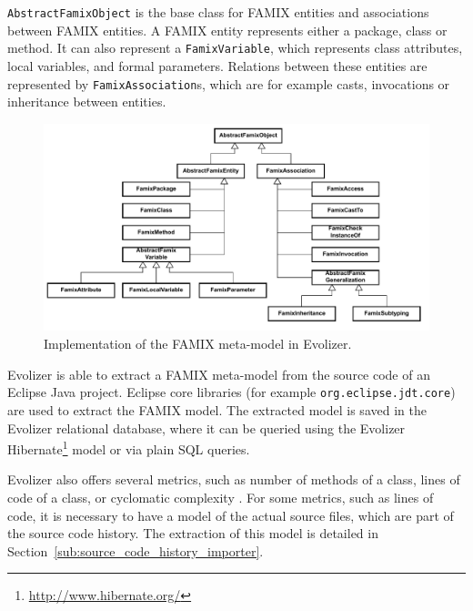 \texttt{AbstractFamixObject} is the base class for FAMIX entities and associations between FAMIX entities. A FAMIX entity represents either a package, class or method. It can also represent a \texttt{FamixVariable}, which represents class attributes, local variables, and formal parameters. Relations between these entities are represented by \texttt{FamixAssociation}s, which are for example casts, invocations or inheritance between entities.

\begin{figure}[!ht]
	\centering
		\includegraphics[width=1\textwidth]{img/FAMIX_object_model.pdf}
	\caption{Implementation of the FAMIX meta-model in Evolizer.}
	\label{fig:evolizer_class_diagram}
\end{figure}

Evolizer is able to extract a FAMIX meta-model from the source code of an Eclipse Java project. Eclipse core libraries (for example \texttt{org.eclipse.jdt.core}) are used to extract the FAMIX model. The extracted model is saved in the Evolizer relational database, where it can be queried using the Evolizer Hibernate\footnote{\url{http://www.hibernate.org/}} model or via plain SQL queries. 

Evolizer also offers several metrics, such as number of methods of a class, lines of code of a class, or cyclomatic complexity \cite{McCabe1976}. For some metrics, such as lines of code, it is necessary to have a model of the actual source files, which are part of the source code history. The extraction of this model is detailed in Section~\ref{sub:source_code_history_importer}.


